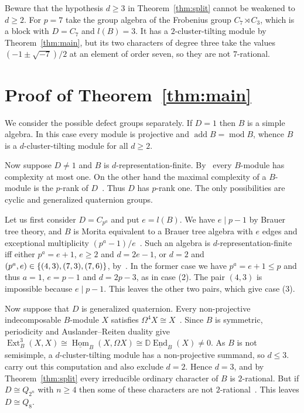 \documentclass[11pt,a4paper,reqno]{amsart}
\theoremstyle{definition}
\DeclareMathOperator{\Hom}{Hom}
\DeclareMathOperator{\End}{End}
\DeclareMathOperator{\Ext}{Ext}
\DeclareMathOperator{\add}{add}
\newcommand{\stHom}{\underline{\Hom}}
\newcommand{\stEnd}{\underline{\End}}
\newcommand{\modu}{\operatorname{mod}}
\newcommand{\dual}{\mathbb D}
\begin{document}
Beware that the hypothesis $d\geq3$ in Theorem~\ref{thm:split} cannot
be weakened to $d\geq2$.  For $p=7$ take the group algebra of the
Frobenius group $C_{7}\rtimes C_{3}$, which is a block with $D=C_{7}$
and $l(B)=3$.  It has a $2$-cluster-tilting module by
Theorem~\ref{thm:main}, but its two characters of degree three take
the values $(-1\pm\sqrt{-7})/2$ at an element of order seven, so they
are not $7$-rational.

\section{Proof of Theorem~\texorpdfstring{\ref{thm:main}}{A}}
\label{sec:classification}
We consider the possible defect groups separately.  If $D=1$ then $B$
is a simple algebra.  In this case every module is projective and
$\add B=\modu B$, whence $B$ is a $d$-cluster-tilting module for all
$d\geq2$.

Now suppose $D\ne1$ and $B$ is $d$-representation-finite.
By~\cite[Theorem 1.1]{EH} every $B$-module has complexity at most one.
On the other hand the maximal complexity of a $B$-module is the
$p$-rank of $D$~\cite[Proposition 2.1]{Bessenrodt}.  Thus $D$ has
$p$-rank one.  The only possibilities are cyclic and generalized
quaternion groups.

Let us first consider $D=C_{p^{a}}$ and put $e=l(B)$.  We have
$e\mid p-1$ by Brauer tree theory, and $B$ is Morita equivalent to a
Brauer tree algebra with $e$ edges and exceptional multiplicity
$(p^{a}-1)/e$~\cite{Dade}.  Such an algebra is
$d$-representation-finite iff either $p^{a}=e+1$, $e\geq2$ and
$d=2e-1$, or $d=2$ and $(p^{a},e)\in\{(4,3),(7,3),(7,6)\}$,
by~\cite[Corollary 1.3 and Remark 1.4]{DK}.  In the former case we
have $p^{a}=e+1\leq p$ and thus $a=1$, $e=p-1$ and $d=2p-3$, as in
case (2).  The pair $(4,3)$ is impossible because $e\mid p-1$.  This
leaves the other two pairs, which give case (3).


Now suppose that $D$ is generalized quaternion.  Every non-projective
indecomposable $B$-module $X$ satisfies
$\Omega^{4}X\cong X$~\cite[Theorem 5.1]{ES}.  Since $B$ is symmetric,
periodicity and Auslander--Reiten duality give
$\Ext_{B}^{3}(X,X)\cong\stHom_{B}(X,\Omega
  X)\cong\dual\stEnd_{B}(X)\neq0$.  As $B$ is not semisimple, a
$d$-cluster-tilting module has a non-projective summand, so $d\leq3$.
\citet[Section 5.2]{EH} carry out this computation and also exclude
$d=2$.  Hence $d=3$, and by Theorem~\ref{thm:split} every irreducible
ordinary character of $B$ is $2$-rational.  But if $D\cong Q_{2^{n}}$
with $n\geq4$ then some of these characters are not
$2$-rational~\cite[Proposition 4.2]{Olsson}.  This leaves
$D\cong Q_{8}$.
\end{document}
